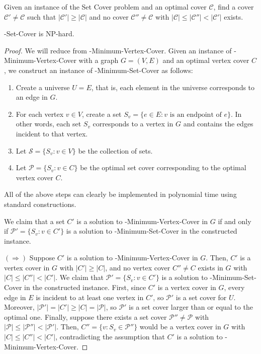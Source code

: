 \begin{definition}
Given an instance of the Set Cover problem and an optimal cover $\mathcal{C}$, find a cover $\mathcal{C}' \neq \mathcal{C}$ such that $|\mathcal{C}'| \geq |\mathcal{C}|$ and no cover $\mathcal{C}'' \neq \mathcal{C}$ with $|\mathcal{C}| \leq |\mathcal{C}''| < |\mathcal{C}'|$ exists.
\end{definition}
\begin{theorem}
\inob{}-Set-Cover is NP-hard.
\end{theorem}
\begin{proof}
We will reduce from \inob{}-Minimum-Vertex-Cover. Given an instance of \inob{}-Minimum-Vertex-Cover with a graph $G=(V,E)$ and an optimal vertex cover $C$, we construct an instance of \inob{}-Minimum-Set-Cover as follows:
\begin{enumerate}
    \item Create a universe $U = E$, that is, each element in the universe corresponds to an edge in $G$.
    \item For each vertex $v \in V$, create a set $S_v = \{e \in E : v \text{ is an endpoint of } e\}$. In other words, each set $S_v$ corresponds to a vertex in $G$ and contains the edges incident to that vertex.
    \item Let $\mathcal{S} = \{S_v : v \in V\}$ be the collection of sets.
    \item Let $\mathcal{P} = \{S_v : v \in C\}$ be the optimal set cover corresponding to the optimal vertex cover $C$.
\end{enumerate}

All of the above steps can clearly be implemented in polynomial time using standard constructions.    

We claim that a set $C'$ is a solution to \inob{}-Minimum-Vertex-Cover in $G$ if and only if $\mathcal{P}' = \{S_v : v \in C'\}$ is a solution to \inob{}-Minimum-Set-Cover in the constructed instance.

$(\Rightarrow)$ Suppose $C'$ is a solution to \inob{}-Minimum-Vertex-Cover in $G$. Then, $C'$ is a vertex cover in $G$ with $|C'| \geq |C|$, and no vertex cover $C'' \neq C$ exists in $G$ with $|C| \leq |C''| < |C'|$. We claim that $\mathcal{P}' = \{S_v : v \in C'\}$ is a solution to \inob{}-Minimum-Set-Cover in the constructed instance. First, since $C'$ is a vertex cover in $G$, every edge in $E$ is incident to at least one vertex in $C'$, so $\mathcal{P}'$ is a set cover for $U$. Moreover, $|\mathcal{P}'| = |C'| \geq |C| = |\mathcal{P}|$, so $\mathcal{P}'$ is a set cover larger than or equal to the optimal one. Finally, suppose there exists a set cover $\mathcal{P}'' \neq \mathcal{P}$ with $|\mathcal{P}| \leq |\mathcal{P}''| < |\mathcal{P}'|$. Then, $C'' = \{v : S_v \in \mathcal{P}''\}$ would be a vertex cover in $G$ with $|C| \leq |C''| < |C'|$, contradicting the assumption that $C'$ is a solution to \inob{}-Minimum-Vertex-Cover.


\end{proof}
